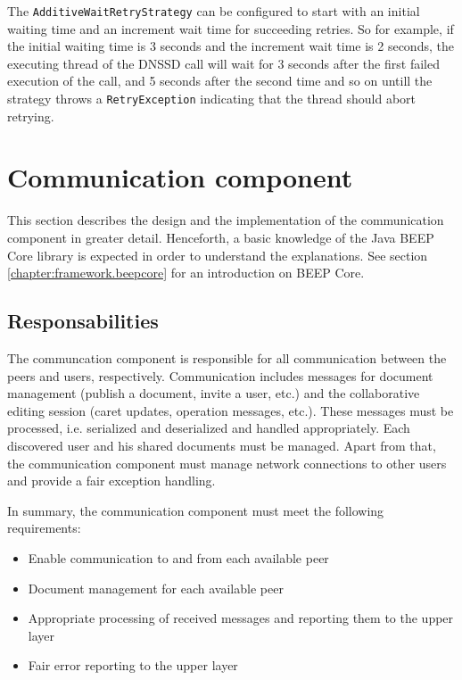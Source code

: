 The \texttt{AdditiveWaitRetryStrategy} can be configured to start with an initial waiting time and an increment wait time for succeeding retries. So for example, if the initial waiting time is 3 seconds and the increment wait time is 2 seconds, the executing thread of the DNSSD call will wait for 3 seconds after the first failed execution of the call, and 5 seconds after the second time and so on untill the strategy throws a \texttt{RetryException} indicating that the thread should abort retrying.


\newpage

\section{Communication component}
This section describes the design and the implementation of the communication component in greater detail. Henceforth, a basic knowledge of the Java BEEP Core library is expected in order to understand the explanations. See section \ref{chapter:framework.beepcore} for an introduction on BEEP Core.

\subsection{Responsabilities}
The communcation component is responsible for all communication between the peers and users, respectively. Communication includes messages for document management (publish a document, invite a user, etc.) and the collaborative editing session (caret updates, operation messages, etc.). These messages must be processed, i.e. serialized and deserialized and handled appropriately. Each discovered user and his shared documents must be managed. 
Apart from that, the communication component must manage network connections to other users and provide a fair exception handling.

In summary, the communication component must meet the following requirements:

\begin{itemize}
 \item Enable communication to and from each available peer
 \item Document management for each available peer
 \item Appropriate processing of received messages and reporting them to the upper layer
 \item Fair error reporting to the upper layer
\end{itemize}


